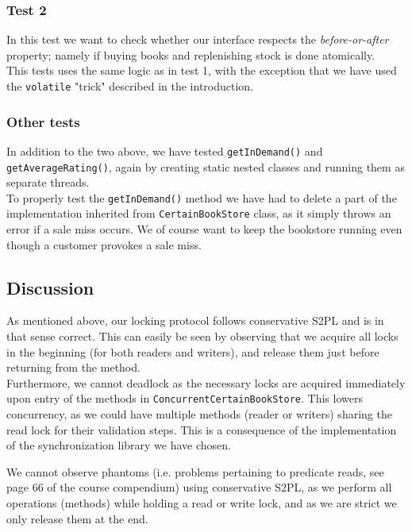 \documentclass[11pt]{article}
\begin{document}
\subsubsection*{Test 2}

In this test we want to check whether our interface respects the \emph{before-or-after}
property; namely if buying books and replenishing stock is done atomically.\\
This tests uses the same logic as in test 1, with the exception that we have used
the \texttt{volatile} "trick" described in the introduction.

\subsubsection*{Other tests}

In addition to the two above, we have tested \texttt{getInDemand()} and
\texttt{getAverageRating()}, again by creating static nested classes and
running them as separate threads.\\
To properly test the \texttt{getInDemand()} method we have had to delete
a part of the implementation inherited from \texttt{CertainBookStore} class,
as it simply throws an error if a sale miss occurs. We of course want
to keep the bookstore running even though a customer provokes a sale miss.

\subsection*{Discussion}

As mentioned above, our locking protocol follows conservative S2PL and
is in that sense correct. This can easily be seen by observing that we
acquire all locks in the beginning (for both readers and writers), and
release them just before returning from the method.\\

Furthermore, we cannot deadlock as the necessary 
locks are acquired immediately upon entry of the methods in
\texttt{ConcurrentCertainBookStore}.
This lowers concurrency, as we could have multiple methods (reader or
writers) sharing the read lock for their validation steps.
This is a consequence of the implementation of the synchronization
library we have chosen.

We cannot observe phantoms (i.e. problems pertaining to predicate reads, see page 66
of the course compendium) using conservative S2PL, as we perform all
operations (methods) while holding a read or write lock, and as we are
strict we only release them at the end.
\end{document}
